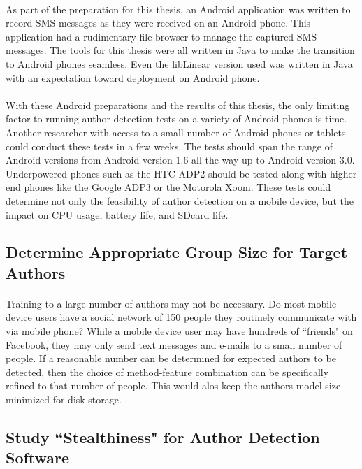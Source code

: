 		\paragraph*{} As part of the preparation for this thesis, an Android application was written to record SMS messages as they were received on an Android phone.  This application had a rudimentary file browser to manage the captured SMS messages.  The tools for this thesis were all written in Java to make the transition to Android phones seamless.  Even the libLinear version used was written in Java with an expectation toward deployment on Android phone.
		\paragraph*{} With these Android preparations and the results of this thesis, the only limiting factor to running author detection tests on a variety of Android phones is time.  Another researcher with access to a small number of Android phones or tablets could conduct these tests in a few weeks.  The tests should span the range of Android versions from Android version 1.6 all the way up to Android version 3.0.  Underpowered phones such as the HTC ADP2 should be tested along with higher end phones like the Google ADP3 or the Motorola Xoom.  These tests could determine not only the feasibility of author detection on a mobile device, but the impact on CPU usage, battery life, and SDcard life.

	\subsection{Determine Appropriate Group Size for Target Authors}
	\paragraph*{}  Training to a large number of authors may not be necessary.  Do most mobile device users have a social network of 150 people they routinely communicate with via mobile phone?  While a mobile device user may have hundreds of ``friends" on Facebook, they may only send text messages and e-mails to a small number of people.  If a reasonable number can be determined for expected authors to be detected, then the choice of method-feature combination can be specifically refined to that number of people.  This would alos keep the authors model size minimized for disk storage.


	\subsection{Study ``Stealthiness" for Author Detection Software}
